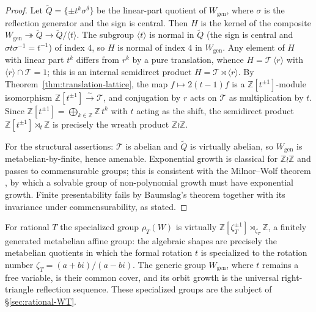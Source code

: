 \documentclass[11pt]{article}
\theoremstyle{plain}
\theoremstyle{definition}
\theoremstyle{remark}
\begin{document}
\begin{proof}
Let $\widetilde Q = \{\pm t^k \sigma^\delta\}$ be the linear-part
quotient of $W_{\mathrm{gen}}$, where $\sigma$ is the reflection
generator and the sign is central.  Then $H$ is the kernel of the
composite
$W_{\mathrm{gen}} \twoheadrightarrow \widetilde Q \to
\widetilde Q / \langle t \rangle$.  The subgroup $\langle t \rangle$ is
normal in $\widetilde Q$ (the sign is central and
$\sigma t \sigma^{-1} = t^{-1}$) of index $4$, so $H$ is normal of
index $4$ in $W_{\mathrm{gen}}$.  Any element of $H$ with linear part
$t^k$ differs from $r^k$ by a pure translation, whence
$H = \mathcal{T}\,\langle r \rangle$ with
$\langle r \rangle \cap \mathcal{T} = 1$; this is an internal
semidirect product $H = \mathcal{T} \rtimes \langle r \rangle$.  By
Theorem~\ref{thm:translation-lattice}, the map $f \mapsto 2(t-1)f$ is a
$\mathbb{Z}[t^{\pm 1}]$-module isomorphism
$\mathbb{Z}[t^{\pm 1}] \xrightarrow{\sim} \mathcal{T}$, and conjugation
by $r$ acts on $\mathcal{T}$ as multiplication by $t$.  Since
$\mathbb{Z}[t^{\pm 1}] = \bigoplus_{k \in \mathbb{Z}} \mathbb{Z}\,t^k$
with $t$ acting as the shift, the semidirect product
$\mathbb{Z}[t^{\pm 1}] \rtimes_t \mathbb{Z}$ is precisely the wreath
product $\mathbb{Z} \wr \mathbb{Z}$.

For the structural assertions: $\mathcal{T}$ is abelian and
$\widetilde Q$ is virtually abelian, so $W_{\mathrm{gen}}$ is
metabelian-by-finite, hence amenable.  Exponential growth is classical
for $\mathbb{Z} \wr \mathbb{Z}$ and passes to commensurable groups; this
is consistent with the Milnor--Wolf theorem \cite{Milnor1968,Wolf1968}, by which a solvable group
of non-polynomial growth must have exponential growth.  Finite
presentability fails by Baumslag's theorem together with its invariance
under commensurability, as stated.
\end{proof}

For rational $T$ the specialized group $\rho_T(W)$ is virtually
$\mathbb{Z}[\zeta_T^{\pm 1}] \rtimes_{\zeta_T} \mathbb{Z}$, a finitely
generated metabelian affine group: the algebraic shapes are precisely
the metabelian quotients in which the formal rotation $t$ is specialized
to the rotation number $\zeta_T = (a+bi)/(a-bi)$.  The generic group
$W_{\mathrm{gen}}$, where $t$ remains a free variable, is their common
cover, and its orbit growth is the universal right-triangle reflection
sequence. These specialized groups are the subject of
\S\ref{sec:rational-WT}.

\end{document}
